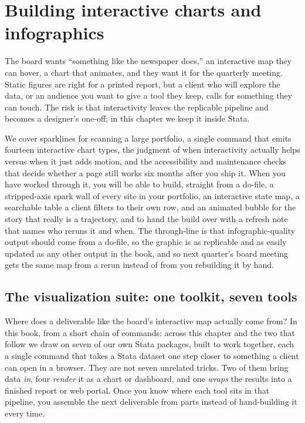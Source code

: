 \chapter{Building interactive charts and infographics}\label{ch:interactive}

The board wants \enquote{something like the newspaper does,} an interactive map they can hover, a chart that animates, and they want it for the quarterly meeting. Static figures are right for a printed report, but a client who will explore the data, or an audience you want to give a tool they keep, calls for something they can touch. The risk is that interactivity leaves the replicable pipeline and becomes a designer's one-off; in this chapter we keep it inside Stata.

We cover sparklines for scanning a large portfolio, a single command that emits fourteen interactive chart types, the judgment of when interactivity actually helps versus when it just adds motion, and the accessibility and maintenance checks that decide whether a page still works six months after you ship it. When you have worked through it, you will be able to build, straight from a do-file, a stripped-axis spark wall of every site in your portfolio, an interactive state map, a searchable table a client filters to their own row, and an animated bubble for the story that really is a trajectory, and to hand the build over with a refresh note that names who reruns it and when. The through-line is that infographic-quality output should come from a do-file, so the graphic is as replicable and as easily updated as any other output in the book, and so next quarter's board meeting gets the same map from a rerun instead of from you rebuilding it by hand.

\section{The visualization suite: one toolkit, seven tools}\label{sec:suite}
Where does a deliverable like the board's interactive map actually come from? In this book, from a short chain of commands: across this chapter and the two that follow we draw on seven of our own Stata packages, built to work together, each a single command that takes a Stata dataset one step closer to something a client can open in a browser. They are not seven unrelated tricks. Two of them bring data \emph{in}, four \emph{render} it as a chart or dashboard, and one \emph{wraps} the results into a finished report or web portal. Once you know where each tool sits in that pipeline, you assemble the next deliverable from parts instead of hand-building it every time.

